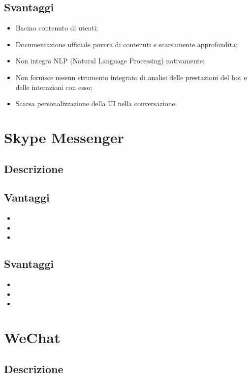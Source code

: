 \documentclass[11pt,notitlepage]{article}
\begin{document}
\subsection*{Svantaggi}
\begin{itemize}
		\item Bacino contenuto di utenti;
		\item Documentazione ufficiale povera di contenuti e scarsamente approfondita; 
		\item Non integra NLP (Natural Language Processing) nativamente;
		\item Non fornisce nessun strumento integrato di analisi delle prestazioni del bot e delle interazioni con esso;
		\item Scarsa personalizzazione della UI nella conversazione.
\end{itemize} 

\bigskip
\section*{Skype Messenger}
\subsection*{Descrizione}

\subsection*{Vantaggi}
\begin{itemize}
		\item 
		\item  
		\item 
\end{itemize} 

\subsection*{Svantaggi}
\begin{itemize}
		\item 
		\item  
		\item 
\end{itemize} 

\bigskip
\section*{WeChat}
\subsection*{Descrizione}
\end{document}
